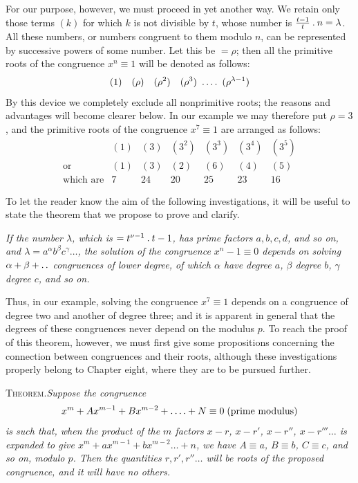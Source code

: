For our purpose, however, we must proceed in yet another way. We retain only those terms $(k)$ for which $k$ is not divisible by $t$, whose number is $\frac{t-1}{t}\mathbin{.} n=\lambda$. All these numbers, or numbers congruent to them modulo $n$, can be represented by successive powers of some number. Let this be $=\rho$; then all the primitive roots of the congruence $x^n\equiv1$ will be denoted as follows:
\[
(1)\quad(\rho)\quad(\rho^2)\quad(\rho^3)\ \dotsfour\ (\rho^{\lambda-1})
\]
By this device we completely exclude all nonprimitive roots; the reasons and advantages will become clearer below. In our example we may therefore put $\rho=3$, and the primitive roots of the congruence $x^7\equiv1$ are arranged as follows:
\[
\begin{array}{rcccccc}
&(1)&(3)&(3^2)&(3^3)&(3^4)&(3^5)\\
\text{or}&(1)&(3)&(2)&(6)&(4)&(5)\\
\text{which are}&7&24&20&25&23&16
\end{array}
\]

To let the reader know the aim of the following investigations, it will be useful to state the theorem that we propose to prove and clarify.

\emph{If the number $\lambda$, which is $=t^{\nu-1}\mathbin{.} t-1$, has prime factors $a,b,c,d$, and so on, and $\lambda=a^\alpha b^\beta c^\gamma\ldots$, the solution of the congruence $x^n-1\equiv0$ depends on solving $\alpha+\beta+\mathinner{.\,.}$ congruences of lower degree, of which $\alpha$ have degree $a$, $\beta$ degree $b$, $\gamma$ degree $c$, and so on.}

Thus, in our example, solving the congruence $x^7\equiv1$ depends on a congruence of degree two and another of degree three; and it is apparent in general that the degrees of these congruences never depend on the modulus $p$. To reach the proof of this theorem, however, we must first give some propositions concerning the connection between congruences and their roots, although these investigations properly belong to Chapter eight, where they are to be pursued further.

\textsc{Theorem.}\quad\emph{Suppose the congruence}
\[
x^m+Ax^{m-1}+Bx^{m-2}+\mathinner{.\,.\,.\,.}+N\equiv0\;(\text{prime modulus})
\]
\emph{is such that, when the product of the $m$ factors $x-r$, $x-r'$, $x-r''$, $x-r'''\ldots$ is expanded to give $x^m+ax^{m-1}+bx^{m-2}\ldots+n$, we have $A\equiv a$, $B\equiv b$, $C\equiv c$, and so on, modulo $p$. Then the quantities $r,r',r''\ldots$ will be roots of the proposed congruence, and it will have no others.}


